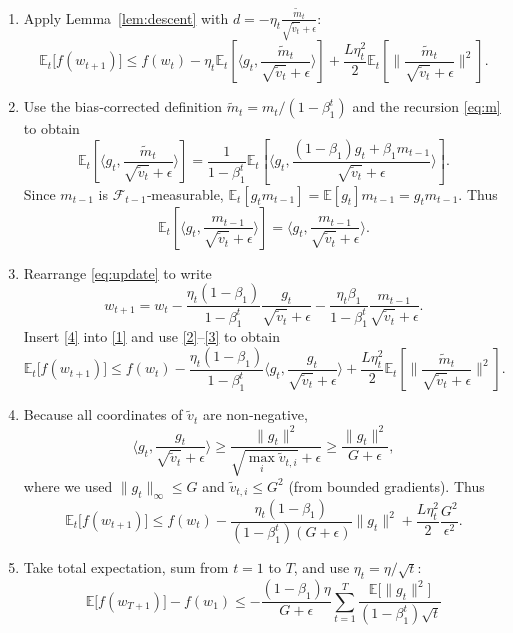 \documentclass{article}
\newcommand{\EE}{\mathbb{E}}
\begin{document}
\begin{enumerate}
\item[Step 1.] Apply Lemma~\ref{lem:descent} with $d=-\eta_t\frac{\tilde m_t}{\sqrt{\tilde v_t}+\epsilon}$:
\[
\EE_t\!\big[f(w_{t+1})\big]
\le f(w_t)-\eta_t\EE_t\!\left[
\Big\langle g_t,\frac{\tilde m_t}{\sqrt{\tilde v_t}+\epsilon}\Big\rangle
\right]
+\frac{L\eta_t^{2}}{2}\EE_t\!\left[
\Big\|\frac{\tilde m_t}{\sqrt{\tilde v_t}+\epsilon}\Big\|^{2}
\right].
\tag{1}
\] 
\item[Step 2.] Use the bias‑corrected definition $\tilde m_t=m_t/(1-\beta_1^t)$ and the recursion \eqref{eq:m} to obtain
\[
\EE_t\!\left[
\Big\langle g_t,\frac{\tilde m_t}{\sqrt{\tilde v_t}+\epsilon}\Big\rangle
\right]
=
\frac{1}{1-\beta_1^t}
\EE_t\!\left[
\Big\langle g_t,\frac{(1-\beta_1)g_t+\beta_1 m_{t-1}}{\sqrt{\tilde v_t}+\epsilon}\Big\rangle
\right].
\tag{2}
\]
Since $m_{t-1}$ is $\mathcal F_{t-1}$‑measurable, $\EE_t[g_t m_{t-1}]=\EE[g_t]m_{t-1}=g_t m_{t-1}$.
Thus
\[
\EE_t\!\left[
\Big\langle g_t,\frac{m_{t-1}}{\sqrt{\tilde v_t}+\epsilon}\Big\rangle
\right]
=
\Big\langle g_t,\frac{m_{t-1}}{\sqrt{\tilde v_t}+\epsilon}\Big\rangle .
\tag{3}
\]
\item[Step 3.] Rearrange \eqref{eq:update} to write
\[
w_{t+1}=w_t-\frac{\eta_t(1-\beta_1)}{1-\beta_1^t}
\frac{g_t}{\sqrt{\tilde v_t}+\epsilon}
-\frac{\eta_t\beta_1}{1-\beta_1^t}
\frac{m_{t-1}}{\sqrt{\tilde v_t}+\epsilon}.
\tag{4}
\]
Insert \eqref{4} into \eqref{1} and use \eqref{2}–\eqref{3} to obtain
\[
\EE_t\!\big[f(w_{t+1})\big]
\le f(w_t)-\frac{\eta_t(1-\beta_1)}{1-\beta_1^t}
\Big\langle g_t,\frac{g_t}{\sqrt{\tilde v_t}+\epsilon}\Big\rangle
+\frac{L\eta_t^{2}}{2}\EE_t\!\left[
\Big\|\frac{\tilde m_t}{\sqrt{\tilde v_t}+\epsilon}\Big\|^{2}
\right].
\tag{5}
\]
\item[Step 4.] Because all coordinates of $\tilde v_t$ are non‑negative,
\[
\Big\langle g_t,\frac{g_t}{\sqrt{\tilde v_t}+\epsilon}\Big\rangle
\ge \frac{\|g_t\|^{2}}{\sqrt{\max_i \tilde v_{t,i}}+\epsilon}
\ge \frac{\|g_t\|^{2}}{G+\epsilon},
\]
where we used $\|\!g_t\|_\infty\le G$ and $\tilde v_{t,i}\le G^{2}$ (from bounded gradients).
Thus
\[
\EE_t\!\big[f(w_{t+1})\big]
\le f(w_t)-\frac{\eta_t(1-\beta_1)}{(1-\beta_1^t)(G+\epsilon)}\|g_t\|^{2}
+\frac{L\eta_t^{2}}{2}\frac{G^{2}}{\epsilon^{2}}.
\tag{6}
\]
\item[Step 5.] Take total expectation, sum from $t=1$ to $T$, and use $\eta_t=\eta/\sqrt{t}$:
\[
\EE\!\big[f(w_{T+1})\big]-f(w_1)
\le
-\frac{(1-\beta_1)\eta}{G+\epsilon}
\sum_{t=1}^{T}\frac{\EE\!\big[\|g_t\|^{2}\big]}{(1-\beta_1^{t})\sqrt{t}}
\]
\end{enumerate}
\end{document}
